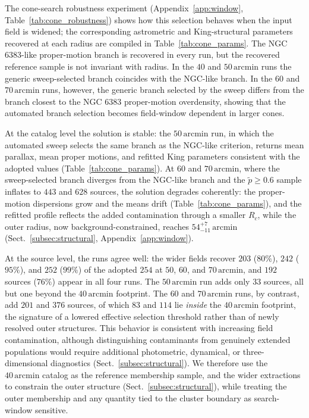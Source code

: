\documentclass{aa}
\begin{document}
The cone-search robustness experiment (Appendix~\ref{app:window}, Table~\ref{tab:cone_robustness}) shows how this selection behaves when the input field is widened; the corresponding astrometric and King-structural parameters recovered at each radius are compiled in Table~\ref{tab:cone_params}. The NGC 6383-like proper-motion branch is recovered in every run, but the recovered reference sample is not invariant with radius. In the $40$ and $50\,\mathrm{arcmin}$ runs the generic sweep-selected branch coincides with the NGC-like branch. In the $60$ and $70\,\mathrm{arcmin}$ runs, however, the generic branch selected by the sweep differs from the branch closest to the NGC 6383 proper-motion overdensity, showing that the automated branch selection becomes field-window dependent in larger cones.

At the catalog level the solution is stable: the $50\,\mathrm{arcmin}$ run, in which the automated sweep selects the same branch as the NGC-like criterion, returns mean parallax, mean proper motions, and refitted King parameters consistent with the adopted values (Table~\ref{tab:cone_params}). At $60$ and $70\,\mathrm{arcmin}$, where the sweep-selected branch diverges from the NGC-like branch and the $\tilde{p}\geq0.6$ sample inflates to $443$ and $628$ sources, the solution degrades coherently: the proper-motion dispersions grow and the means drift (Table~\ref{tab:cone_params}), and the refitted profile reflects the added contamination through a smaller $R_c$, while the outer radius, now background-constrained, reaches $54^{+7}_{-11}\,\mathrm{arcmin}$ (Sect.~\ref{subsec:structural}, Appendix~\ref{app:window}).

At the source level, the runs agree well: the wider fields recover $203$ ($80\%$), $242$ ($95\%$), and $252$ ($99\%$) of the adopted $254$ at $50$, $60$, and $70\,\mathrm{arcmin}$, and $192$ sources ($76\%$) appear in all four runs. The $50\,\mathrm{arcmin}$ run adds only $33$ sources, all but one beyond the $40\,\mathrm{arcmin}$ footprint. The $60$ and $70\,\mathrm{arcmin}$ runs, by contrast, add $201$ and $376$ sources, of which $83$ and $114$ lie \emph{inside} the $40\,\mathrm{arcmin}$ footprint, the signature of a lowered effective selection threshold rather than of newly resolved outer structures. This behavior is consistent with increasing field contamination, although distinguishing contaminants from genuinely extended populations would require additional photometric, dynamical, or three-dimensional diagnostics (Sect.~\ref{subsec:structural}). We therefore use the $40\,\mathrm{arcmin}$ catalog as the reference membership sample, and the wider extractions to constrain the outer structure (Sect.~\ref{subsec:structural}), while treating the outer membership and any quantity tied to the cluster boundary as search-window sensitive.
\end{document}
